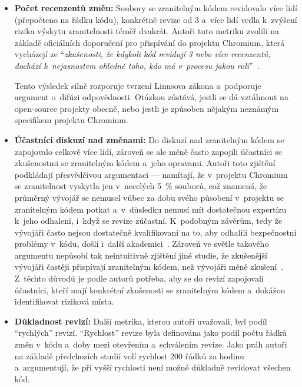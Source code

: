 \begin{itemize}
    \item \textbf{Počet recenzentů změn:} \enskip
        Soubory se zranitelným kódem revidovalo více lidí (přepočteno na řádku kódu), konkrétně revize od 3 a~více lidí vedla k~zvýšení rizika výskytu zranitelnosti téměř dvakrát. Autoři tuto metriku zvolili na základě oficiálních doporučení pro přispívání do projektu Chromium, která vycházejí ze ``\textit{zkušenosti, že kdykoli kód revidují 3 nebo více recenzentů, dochází k~nejasnostem ohledně toho, kdo má v~procesu jakou roli}''~\cite{osslinuslaw2014}.
        
        Tento výsledek silně rozporuje tvrzení Linusova zákona a~podporuje argument o~difúzi odpovědnosti. Otázkou zůstává, jestli se dá vztáhnout na open-source projekty obecně, nebo jestli je způsoben nějakým neznámým specifikem projektu Chromium.

    \item \textbf{Účastníci diskuzí nad změnami:} \enskip
        Do diskuzí nad zranitelným kódem se zapojovalo celkově více lidí, zároveň se ale méně často zapojili účastníci se zkušenostmi se zranitelným kódem a~jeho opravami. Autoři toto zjištění podkládají přesvědčivou argumentací --- namítají, že v~projektu Chromium se zranitelnost vyskytla jen v~necelých 5~\% souborů, což znamená, že průměrný vývojář se nemusel vůbec za dobu svého působení v~projektu se zranitelným kódem potkat a~v~důsledku nemusí mít dostatečnou expertízu k~jeho odhalení, i~když se revize zúčastní. K~podobným závěrům, tedy že vývojáři často nejsou dostatečně kvalifikovaní na to, aby odhalili bezpečnostní problémy v~kódu, došli i~další akademici~\cite{wen2019security, open-vs-closed}. Zároveň ve světle takového argumentu nepůsobí tak neintuitivně zjištění jiné studie, že zkušenější vývojáři častěji přispívají zranitelným kódem, než vývojáři méně zkušení~\cite{bosu2014characteristics}. Z~těchto důvodů je podle autorů potřeba, aby se do revizí zapojovali účastníci, kteří mají konkrétní zkušenosti se zranitelným kódem a~dokážou identifikovat riziková místa.

    \item \textbf{Důkladnost revizí:} \enskip
        Další metrika, kterou autoři uvažovali, byl podíl ``rychlých'' revizí. ``Rychlost'' revize byla definována jako podíl počtu řádků změn v~kódu a~doby mezi otevřením a~schválením revize. Jako práh autoři na základě předchozích studií volí rychlost 200 řádků za hodinu a~argumentují, že při vyšší rychlosti není možné důkladně revidovat všechen kód.


\end{itemize}
